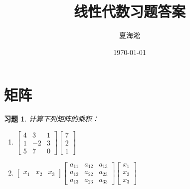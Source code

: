 \documentclass{ctexart}
\author{夏海淞}
\title{线性代数习题答案}
\date{\today}
\newtheorem{problem}{习题}[section]
\begin{document}
\maketitle
\tableofcontents

\clearpage
\section{矩阵}

\begin{problem}
计算下列矩阵的乘积：

\begin{enumerate}
    \item[(1)] \(\begin{bmatrix}
            4 & 3 & 1 \\1&-2&3\\5&7&0
        \end{bmatrix}\begin{bmatrix}
            7 \\2\\1
        \end{bmatrix}\)
    \item[(5)] \(\begin{bmatrix}
            x_1 & x_2 & x_3
        \end{bmatrix}
        \begin{bmatrix}
            a_{11} & a_{12} & a_{13} \\
            a_{12} & a_{22} & a_{23} \\
            a_{13} & a_{23} & a_{33}
        \end{bmatrix}
        \begin{bmatrix}
            x_1 \\x_2\\x_3
        \end{bmatrix}\)
\end{enumerate}
\end{problem}
\end{document}
